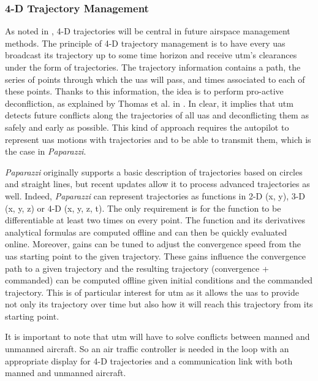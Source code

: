 	\subsubsection{4-D Trajectory Management}
		As noted in \cite{erzberger_4D_2002}, 4-D trajectories will be central in future airspace management methods. The principle of 4-D trajectory management is to have every \gls{uas} broadcast its trajectory up to some time horizon and receive \gls{utm}'s clearances under the form of trajectories. 
		The trajectory information contains a path, the series of points through which the \gls{uas} will pass, and times associated to each of these points. 
		Thanks to this information, the idea is to perform pro-active deconfliction, as explained by Thomas et al. in \cite{thomas_4D_2015}. In clear, it implies that \gls{utm} detects future conflicts along the trajectories of all \gls{uas} and deconflicting them as safely and early as possible.
		This kind of approach requires the autopilot to represent \gls{uas} motions with trajectories and to be able to transmit them, which is the case in \emph{Paparazzi}.
		
		\emph{Paparazzi} originally supports a basic description of trajectories based on circles and straight lines, but recent updates allow it to process advanced trajectories as well. 
		Indeed, \emph{Paparazzi} can represent trajectories as functions in 2-D (x, y), 3-D (x, y, z) or 4-D (x, y, z, t). The only requirement is for the function to be differentiable at least two times on every point. The function and its derivatives analytical formulas are computed offline and can then be quickly evaluated online.
		Moreover, gains can be tuned to adjust the convergence speed from the \gls{uas} starting point to the given trajectory. These gains influence the convergence path to a given trajectory and the resulting trajectory (convergence + commanded) can be computed offline given initial conditions and the commanded trajectory.
		This is of particular interest for \gls{utm} as it allows the \gls{uas} to provide not only its trajectory over time but also how it will reach this trajectory from its starting point.	

		It is important to note that \gls{utm} will have to solve conflicts between manned and unmanned aircraft. So an air traffic controller is needed in the loop with an appropriate display for 4-D trajectories and a communication link with both manned and unmanned aircraft.
		
